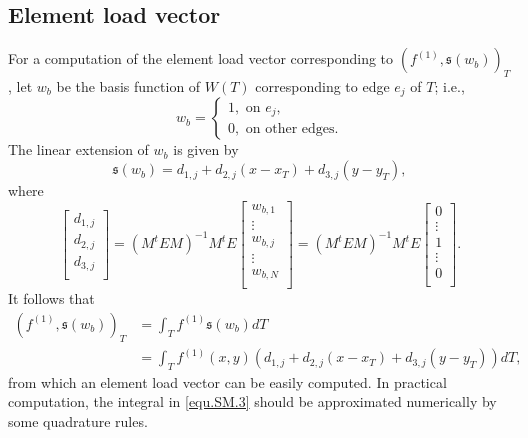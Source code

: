 \documentclass[final,leqno]{siamltex704}
\def\S{{\mathfrak s}}
\begin{document}
\subsection{Element load vector} For a computation of the element load vector corresponding to $(f^{(1)}, \S(w_b))_T$, let $w_{b}$ be the basis function of $W(T)$ corresponding to edge $e_j$ of $T$; i.e.,
\begin{equation*}
w_{b}=\left\{
\begin{array}{lllll}
1, \text{ on } e_j,\\
0, \text{ on other edges}.
\end{array}
\right.
\end{equation*}
The linear extension of $w_b$ is given by
$$
\S(w_b) = d_{1,j} + d_{2,j}(x-x_T) + d_{3,j}(y-y_T),
$$
where
\begin{equation*}
\begin{bmatrix}
d_{1,j}\\
d_{2,j}\\
d_{3,j}\\
\end{bmatrix}
=(M^tEM)^{-1}M^tE
\begin{bmatrix}
w_{b,1}\\
\vdots \\
w_{b,j}\\
\vdots \\
w_{b,N}\\
\end{bmatrix}
=(M^tEM)^{-1}M^tE
\begin{bmatrix}
0\\
\vdots \\
1\\
\vdots \\
0\\
\end{bmatrix}.
\end{equation*}
It follows that
\begin{equation}\label{equ.SM.3}
\begin{split}
(f^{(1)}, \S(w_b))_T
& = \int_{T}f^{(1)} \S(w_b)dT\\
& = \int_{T}f^{(1)}(x,y) (d_{1,j} + d_{2,j}(x-x_T) + d_{3,j}(y-y_T)) dT,
\end{split}
\end{equation}
from which an element load vector can be easily computed. In practical computation, the integral in \eqref{equ.SM.3} should be approximated numerically by some quadrature rules.
\end{document}
